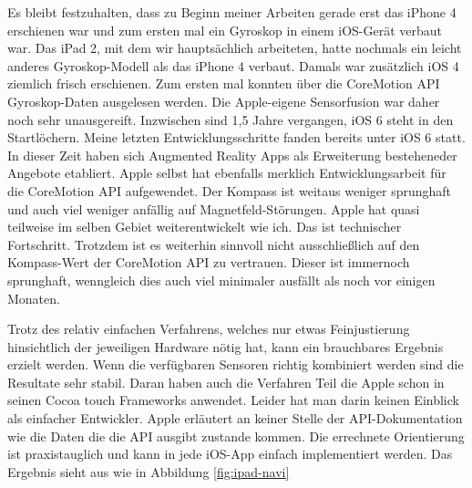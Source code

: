 Es bleibt festzuhalten, dass zu Beginn meiner Arbeiten gerade erst das iPhone 4 erschienen war und zum ersten mal ein Gyroskop in einem iOS-Gerät verbaut war. Das iPad 2, mit dem wir hauptsächlich arbeiteten, hatte nochmals ein leicht anderes Gyroskop-Modell als das iPhone 4 verbaut. Damals war zusätzlich iOS 4 ziemlich frisch erschienen. Zum ersten mal konnten über die CoreMotion API Gyroskop-Daten ausgelesen werden. Die Apple-eigene Sensorfusion war daher noch sehr unausgereift. Inzwischen sind 1,5 Jahre vergangen, iOS 6 steht in den Startlöchern. Meine letzten Entwicklungsschritte fanden bereits unter iOS 6 statt. In dieser Zeit haben sich Augmented Reality Apps als Erweiterung besteheneder Angebote etabliert. Apple selbst hat ebenfalls merklich Entwicklungsarbeit für die CoreMotion API aufgewendet. Der Kompass ist weitaus weniger sprunghaft und auch viel weniger anfällig auf Magnetfeld-Störungen. Apple hat quasi teilweise im selben Gebiet weiterentwickelt wie ich. Das ist technischer Fortschritt. Trotzdem ist es weiterhin sinnvoll nicht ausschließlich auf den Kompass-Wert der CoreMotion API zu vertrauen. Dieser ist immernoch sprunghaft, wenngleich dies auch viel minimaler ausfällt als noch vor einigen Monaten. 

Trotz des relativ einfachen Verfahrens, welches nur etwas Feinjustierung hinsichtlich der jeweiligen Hardware nötig hat, kann ein brauchbares Ergebnis erzielt werden. Wenn die verfügbaren Sensoren richtig kombiniert werden sind die Resultate sehr stabil. Daran haben auch die Verfahren Teil die Apple schon in seinen Cocoa touch Frameworks anwendet. Leider hat man darin keinen Einblick als einfacher Entwickler. Apple erläutert an keiner Stelle der API-Dokumentation wie die Daten die die API ausgibt zustande kommen. Die errechnete Orientierung ist praxistauglich und kann in jede iOS-App einfach implementiert werden. Das Ergebnis sieht aus wie in Abbildung \ref{fig:ipad-navi}

